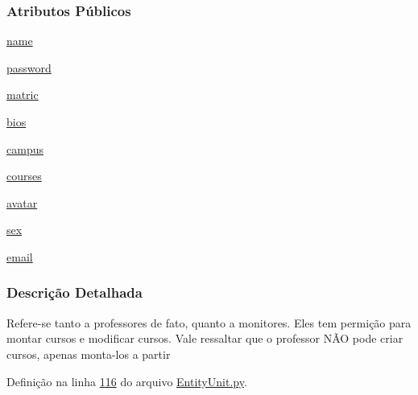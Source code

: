 \subsubsection*{Atributos Públicos}
\begin{DoxyCompactItemize}
\item 
\hyperlink{classELO_1_1EntityUnit_1_1Professor_ae85cc0fc9c64a277111a85e87efbe049}{name}
\item 
\hyperlink{classELO_1_1EntityUnit_1_1Professor_af0810854479e9f9a806eb6bfe7468e60}{password}
\item 
\hyperlink{classELO_1_1EntityUnit_1_1Professor_afc64d3f1b0e7c88530c7ee62f67ef671}{matric}
\item 
\hyperlink{classELO_1_1EntityUnit_1_1Professor_a2e403e0bfc353dcdf9988140d61d5ca7}{bios}
\item 
\hyperlink{classELO_1_1EntityUnit_1_1Professor_ad95cfc8959dcb02a6afff422703d4dde}{campus}
\item 
\hyperlink{classELO_1_1EntityUnit_1_1Professor_a6eb0d2789bb8750fb275aca0f8bb74bb}{courses}
\item 
\hyperlink{classELO_1_1EntityUnit_1_1Professor_a593a0636e87dcdd9ced2e6b7494a45dc}{avatar}
\item 
\hyperlink{classELO_1_1EntityUnit_1_1Professor_ac049dc360c4af27037158e33577288e1}{sex}
\item 
\hyperlink{classELO_1_1EntityUnit_1_1Professor_a7c6f76f185515050334dc74a030043a7}{email}
\end{DoxyCompactItemize}


\subsubsection{Descrição Detalhada}
Refere-\/se tanto a professores de fato, quanto a monitores. Eles tem permição para montar cursos e modificar cursos. Vale ressaltar que o professor NÃ\-O pode criar cursos, apenas monta-\/los a partir 

Definição na linha \hyperlink{EntityUnit_8py_source_l00116}{116} do arquivo \hyperlink{EntityUnit_8py_source}{Entity\-Unit.\-py}.



